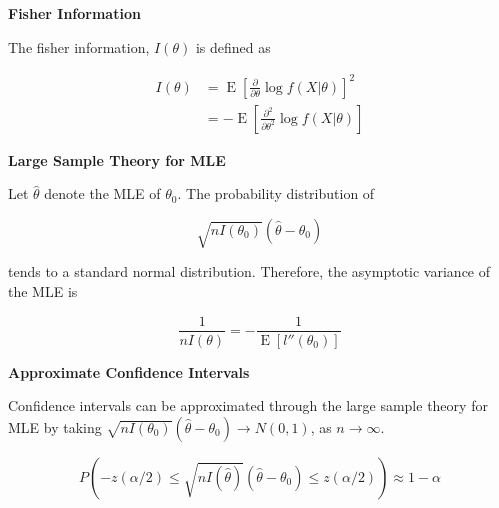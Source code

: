 \documentclass[a4paper]{article}
\newcommand{\subheading}[1]{{\scriptsize\textbf{#1}}}
\newcommand{\expectation}[1]{\operatorname{E}[#1]}
\begin{document}
\begin{multicols*}{4}
\subheading{Fisher Information}

The fisher information, $I(\theta)$ is defined as

\begin{align*}
  I(\theta) &= \operatorname{E} \left [
    \frac{\partial}{\partial\theta} \log f(X|\theta)
  \right ]^2 \\
    &= - \operatorname{E} \left [
      \frac{\partial^2}{\partial\theta^2} \log f(X|\theta)
  \right ]
\end{align*}

\subheading{Large Sample Theory for MLE}

Let $\hat{\theta}$ denote the MLE of $\theta_0$. The probability distribution of

$$\sqrt{nI(\theta_0)}(\hat{\theta} - \theta_0)$$

tends to a standard normal distribution. Therefore, the asymptotic variance of
the MLE is

$$\frac{1}{nI(\theta)} = - \frac{1}{\expectation{l''(\theta_0)}}$$

\subheading{Approximate Confidence Intervals}

Confidence intervals can be approximated through the large sample theory for MLE
by taking $\sqrt{nI(\theta_0)}(\hat{\theta}-\theta_0) \rightarrow N(0, 1)$, as
$n \rightarrow \infty$. \smallskip

$$P \left (
  -z(\alpha/2) \leq
  \sqrt{nI(\hat{\theta})}(\hat{\theta} - \theta_0) \leq
  z(\alpha/2)
\right ) \approx 1 - \alpha$$

\end{multicols*}
\end{document}
